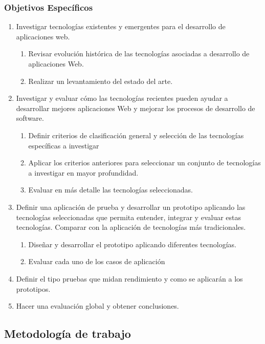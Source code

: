 \subsubsection{Objetivos Específicos}
\begin{enumerate}
 \item Investigar tecnologías existentes y emergentes para el desarrollo de aplicaciones web.
 \begin{enumerate}
   \item  Revisar evolución histórica de las tecnologías asociadas a desarrollo de aplicaciones Web.
   \item  Realizar un levantamiento del estado del arte.
 \end{enumerate}
 \item Investigar y evaluar cómo las tecnologías recientes pueden ayudar a desarrollar mejores aplicaciones 
	Web y  mejorar los procesos de desarrollo de software.
 \begin{enumerate}
   \item Definir criterios de clasificación general y selección de las tecnologías específicas a investigar
   \item Aplicar los criterios anteriores para seleccionar un conjunto de tecnologías a investigar en mayor profundidad.
   \item Evaluar en más detalle las tecnologías seleccionadas.
 \end{enumerate}
 \item Definir una aplicación de prueba y desarrollar un prototipo aplicando las tecnologías seleccionadas que permita 
	entender, integrar y evaluar estas tecnologías. Comparar con la aplicación de tecnologías más tradicionales.
 \begin{enumerate}
   \item Diseñar y desarrollar el prototipo aplicando diferentes tecnologías.
   \item Evaluar cada uno de los casos de aplicación
 \end{enumerate}
 \item Definir el tipo pruebas que midan rendimiento y como se aplicarán a los prototipos. 
 \item Hacer una evaluación global y obtener conclusiones.
\end{enumerate}


\subsection{Metodología de trabajo}
 
